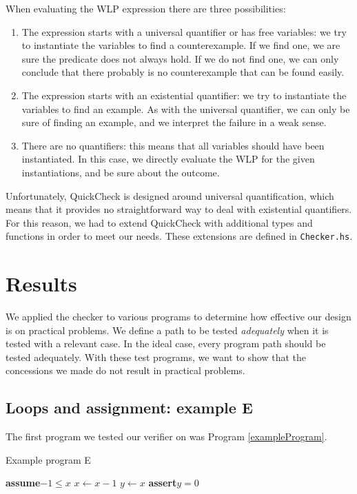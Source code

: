 \documentclass[a4paper]{article}
\newcommand{\Assert}{\State\textbf{assert}\xspace}
\newcommand{\Assume}{\State\textbf{assume}\xspace}
\begin{document}
When evaluating the WLP expression there are three possibilities:

\begin{enumerate}
\item The expression starts with a universal quantifier or has free variables:
we try to instantiate the variables to find a counterexample. If we find one, we
are sure the predicate does not always hold. If we do not find one, we can only
conclude that there probably is no counterexample that can be found easily.
\item The expression starts with an existential quantifier: we try to instantiate
the variables to find an example. As with the universal quantifier, we can only
be sure of finding an example, and we interpret the failure in a weak sense.
\item There are no quantifiers: this means that all variables should have been
instantiated. In this case, we directly evaluate the WLP for the given
instantiations, and be sure about the outcome.
\end{enumerate}

Unfortunately, QuickCheck is designed around universal quantification, which means
that it provides no straightforward way to deal with existential quantifiers.
For this reason, we had to extend QuickCheck with additional types and functions
in order to meet our needs. These extensions are defined in \texttt{Checker.hs}.

\section{Results}

We applied the checker to various programs to determine how effective our design is on practical problems. We define a path to be tested \emph{adequately} when it is tested with a relevant case. In the ideal case, every program path should be tested adequately. With these test programs, we want to show that the concessions we made do not result in practical problems.

\subsection{Loops and assignment: example E}

The first program we tested our verifier on was Program \ref{exampleProgram}.
\begin{algorithm}\label{exampleProgram}
\caption{Example program E}
\begin{algorithmic}
\Assume $-1 \leq x$
	\State $x \gets x - 1$
\EndWhile
\State $y \gets x$
\Assert $y = 0$
\end{algorithmic}
\end{algorithm}
\end{document}
